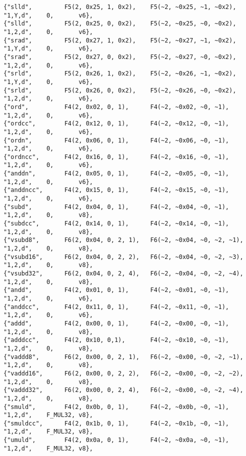 {\small
\begin{verbatim}
{"slld",         F5(2, 0x25, 1, 0x2),    F5(~2, ~0x25, ~1, ~0x2),      "1,Y,d",    0,       v6},
{"slld",         F5(2, 0x25, 0, 0x2),    F5(~2, ~0x25, ~0, ~0x2),      "1,2,d",    0,       v6},
{"srad",         F5(2, 0x27, 1, 0x2),    F5(~2, ~0x27, ~1, ~0x2),      "1,Y,d",    0,       v6},
{"srad",         F5(2, 0x27, 0, 0x2),    F5(~2, ~0x27, ~0, ~0x2),      "1,2,d",    0,       v6},
{"srld",         F5(2, 0x26, 1, 0x2),    F5(~2, ~0x26, ~1, ~0x2),      "1,Y,d",    0,       v6},
{"srld",         F5(2, 0x26, 0, 0x2),    F5(~2, ~0x26, ~0, ~0x2),      "1,2,d",    0,       v6},
{"ord",          F4(2, 0x02, 0, 1),      F4(~2, ~0x02, ~0, ~1),        "1,2,d",    0,       v6},
{"ordcc",        F4(2, 0x12, 0, 1),      F4(~2, ~0x12, ~0, ~1),        "1,2,d",    0,       v6},
{"ordn",         F4(2, 0x06, 0, 1),      F4(~2, ~0x06, ~0, ~1),        "1,2,d",    0,       v6},
{"ordncc",       F4(2, 0x16, 0, 1),      F4(~2, ~0x16, ~0, ~1),        "1,2,d",    0,       v6},
{"anddn",        F4(2, 0x05, 0, 1),      F4(~2, ~0x05, ~0, ~1),        "1,2,d",    0,       v6},
{"anddncc",      F4(2, 0x15, 0, 1),      F4(~2, ~0x15, ~0, ~1),        "1,2,d",    0,       v6},
{"subd",         F4(2, 0x04, 0, 1),      F4(~2, ~0x04, ~0, ~1),        "1,2,d",    0,       v8},
{"subdcc",       F4(2, 0x14, 0, 1),      F4(~2, ~0x14, ~0, ~1),        "1,2,d",    0,       v8},
{"vsubd8",       F6(2, 0x04, 0, 2, 1),   F6(~2, ~0x04, ~0, ~2, ~1),    "1,2,d",    0,       v8},
{"vsubd16",      F6(2, 0x04, 0, 2, 2),   F6(~2, ~0x04, ~0, ~2, ~3),    "1,2,d",    0,       v8},
{"vsubd32",      F6(2, 0x04, 0, 2, 4),   F6(~2, ~0x04, ~0, ~2, ~4),    "1,2,d",    0,       v8},
{"andd",         F4(2, 0x01, 0, 1),      F4(~2, ~0x01, ~0, ~1),        "1,2,d",    0,       v6},
{"anddcc",       F4(2, 0x11, 0, 1),      F4(~2, ~0x11, ~0, ~1),        "1,2,d",    0,       v6},
{"addd",         F4(2, 0x00, 0, 1),      F4(~2, ~0x00, ~0, ~1),        "1,2,d",    0,       v8},
{"adddcc",       F4(2, 0x10, 0,1),       F4(~2, ~0x10, ~0, ~1),        "1,2,d",    0,       v8},
{"vaddd8",       F6(2, 0x00, 0, 2, 1),   F6(~2, ~0x00, ~0, ~2, ~1),    "1,2,d",    0,       v8},
{"vaddd16",      F6(2, 0x00, 0, 2, 2),   F6(~2, ~0x00, ~0, ~2, ~2),    "1,2,d",    0,       v8},
{"vaddd32",      F6(2, 0x00, 0, 2, 4),   F6(~2, ~0x00, ~0, ~2, ~4),    "1,2,d",    0,       v8},
{"smuld",        F4(2, 0x0b, 0, 1),      F4(~2, ~0x0b, ~0, ~1),        "1,2,d",    F_MUL32, v8},
{"smuldcc",      F4(2, 0x1b, 0, 1),      F4(~2, ~0x1b, ~0, ~1),        "1,2,d",    F_MUL32, v8},
{"umuld",        F4(2, 0x0a, 0, 1),      F4(~2, ~0x0a, ~0, ~1),        "1,2,d",    F_MUL32, v8},

\end{verbatim}}
